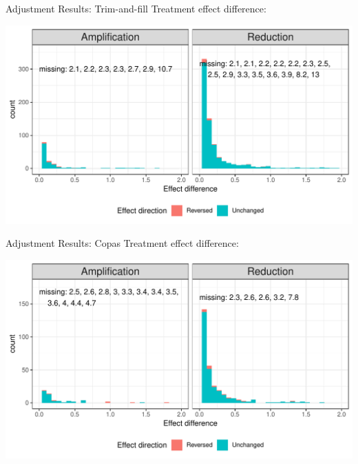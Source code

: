 \documentclass[english]{beamer}\usepackage[]{graphicx}\usepackage[]{color}
\makeatletter
\def\maxwidth{ %
  \ifdim\Gin@nat@width>\linewidth
    \linewidth
  \else
    \Gin@nat@width
  \fi
}
\newenvironment{knitrout}{}{} %
\makeatother
\begin{document}
\begin{frame}[fragile]{Adjustment Results: Trim-and-fill}
Treatment effect difference:

\vspace{-3mm}
\begin{knitrout}
\color{fgcolor}
\includegraphics[width=\maxwidth]{figure/unnamed-chunk-23-1} 

\end{knitrout}
\end{frame}


\begin{frame}[fragile]{Adjustment Results: Copas}
Treatment effect difference:

\vspace{-3mm}
\begin{knitrout}
\color{fgcolor}
\includegraphics[width=\maxwidth]{figure/unnamed-chunk-24-1} 

\end{knitrout}
\end{frame}
\end{document}
